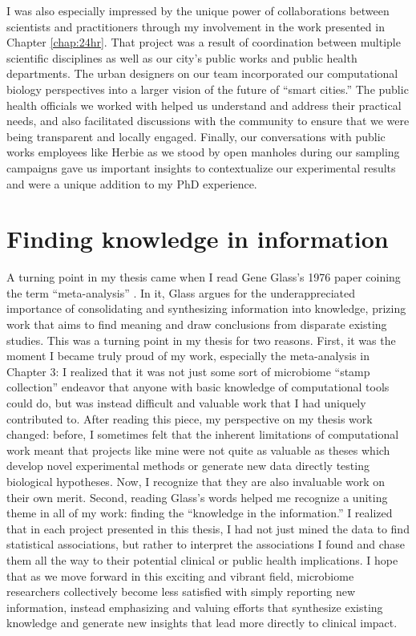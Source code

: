 I was also especially impressed by the unique power of collaborations between scientists and practitioners through my involvement in the work presented in Chapter \ref{chap:24hr}.
That project was a result of coordination between multiple scientific disciplines as well as our city's public works and public health departments.
The urban designers on our team incorporated our computational biology perspectives into a larger vision of the future of ``smart cities.''
The public health officials we worked with helped us understand and address their practical needs, and also facilitated discussions with the community to ensure that we were being transparent and locally engaged.
Finally, our conversations with public works employees like Herbie as we stood by open manholes during our sampling campaigns gave us important insights to contextualize our experimental results and were a unique addition to my PhD experience.

\section{Finding knowledge in information}

A turning point in my thesis came when I read Gene Glass's 1976 paper coining the term ``meta-analysis'' \cite{glass-1976}.
In it, Glass argues for the underappreciated importance of consolidating and synthesizing information into knowledge, prizing work that aims to find meaning and draw conclusions from disparate existing studies.
This was a turning point in my thesis for two reasons.
First, it was the moment I became truly proud of my work, especially the meta-analysis in Chapter 3: I realized that it was not just some sort of microbiome ``stamp collection'' endeavor that anyone with basic knowledge of computational tools could do, but was instead difficult and valuable work that I had uniquely contributed to.
After reading this piece, my perspective on my thesis work changed: before, I sometimes felt that the inherent limitations of computational work meant that projects like mine were not quite as valuable as theses which develop novel experimental methods or generate new data directly testing biological hypotheses.
Now, I recognize that they are also invaluable work on their own merit.
Second, reading Glass's words helped me recognize a uniting theme in all of my work: finding the ``knowledge in the information.''
I realized that in each project presented in this thesis, I had not just mined the data to find statistical associations, but rather to interpret the associations I found and chase them all the way to their potential clinical or public health implications.
I hope that as we move forward in this exciting and vibrant field, microbiome researchers collectively become less satisfied with simply reporting new information, instead emphasizing and valuing efforts that synthesize existing knowledge and generate new insights that lead more directly to clinical impact.

\begin{singlespace}


\end{singlespace}
